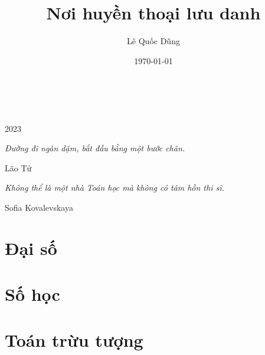 \documentclass[oneside]{book}
\title{Nơi huyền thoại lưu danh}
\author{Lê Quốc Dũng}
\date{\today}
\begin{document}
\begin{titlepage}
		\\
			
		\vspace{10mm}
		\\
		\vspace{\fill}
		\centering \large{2023}
\end{titlepage}

\newpage

\vspace*{2cm}

\begin{center}
	{\Large 
			\textit{Đường đi ngàn dặm, bắt đầu bằng một bước chân.}
	}
	\Large{\parbox{10cm}{
		\begin{raggedleft}
		\vspace{.5cm}\hfill{Lão Tử}
		\end{raggedleft}
	}
}
\end{center}

\begin{center}
	{\Large 
			\textit{Không thể là một nhà Toán học mà không có tâm hồn thi sĩ.}
	}
	\Large{\parbox{10cm}{
		\begin{raggedleft}
		\vspace{.5cm}\hfill{Sofia Kovalevskaya}
		\end{raggedleft}
	}
}
\end{center}

\newpage

\tableofcontents

\newpage



\part{Đại số}



\part{Số học}



\part{Toán trừu tượng}




\end{document}

